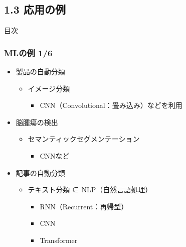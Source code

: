 \documentclass[aspectratio=169, dvipdfmx, 14pt, xcolor={svgnames,dvipsnames}]{beamer}
\def\tightlist{\itemsep1pt\parskip0pt\parsep0pt}
\begin{document}

\subsection{1.3 応用の例}\label{ux5fdcux7528ux306eux4f8b}
\begin{frame}{目次}
  \tableofcontents[currentsubsection]
\end{frame}


\begin{frame}
  \frametitle{MLの例 1/6}
  \begin{itemize}
    \tightlist
    \item
          製品の自動分類

          \begin{itemize}
            \tightlist
            \item
                  イメージ分類

                  \begin{itemize}
                    \tightlist
                    \item
                          CNN（Convolutional：畳み込み）などを利用
                  \end{itemize}
          \end{itemize}
    \item
          脳腫瘍の検出

          \begin{itemize}
            \tightlist
            \item
                  セマンティックセグメンテーション

                  \begin{itemize}
                    \tightlist
                    \item
                          CNNなど
                  \end{itemize}
          \end{itemize}
    \item
          記事の自動分類

          \begin{itemize}
            \tightlist
            \item
                  テキスト分類 ∈ NLP（自然言語処理）

                  \begin{itemize}
                    \tightlist
                    \item
                          RNN（Recurrent：再帰型）
                    \item
                          CNN
                    \item
                          Transformer
                  \end{itemize}
          \end{itemize}
  \end{itemize}
\end{frame}
\end{document}
